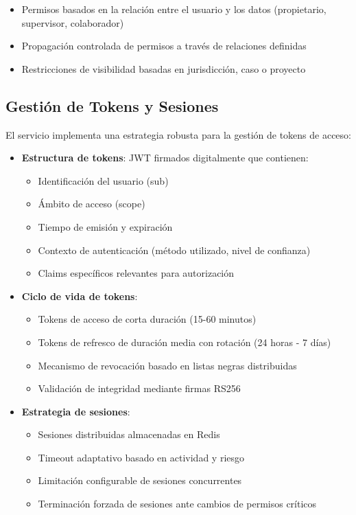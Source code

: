 \documentclass[12pt,a4paper]{article}
\begin{document}
\begin{itemize}
    \item Permisos basados en la relación entre el usuario y los datos (propietario, supervisor, colaborador)
    \item Propagación controlada de permisos a través de relaciones definidas
    \item Restricciones de visibilidad basadas en jurisdicción, caso o proyecto
\end{itemize}

\subsection{Gestión de Tokens y Sesiones}
\label{subsec:as-tokens}

El servicio implementa una estrategia robusta para la gestión de tokens de acceso:

\begin{itemize}
    \item \textbf{Estructura de tokens}: JWT firmados digitalmente que contienen:
    \begin{itemize}
        \item Identificación del usuario (sub)
        \item Ámbito de acceso (scope)
        \item Tiempo de emisión y expiración
        \item Contexto de autenticación (método utilizado, nivel de confianza)
        \item Claims específicos relevantes para autorización
    \end{itemize}
    
    \item \textbf{Ciclo de vida de tokens}:
    \begin{itemize}
        \item Tokens de acceso de corta duración (15-60 minutos)
        \item Tokens de refresco de duración media con rotación (24 horas - 7 días)
        \item Mecanismo de revocación basado en listas negras distribuidas
        \item Validación de integridad mediante firmas RS256
    \end{itemize}
    
    \item \textbf{Estrategia de sesiones}:
    \begin{itemize}
        \item Sesiones distribuidas almacenadas en Redis
        \item Timeout adaptativo basado en actividad y riesgo
        \item Limitación configurable de sesiones concurrentes
        \item Terminación forzada de sesiones ante cambios de permisos críticos
    \end{itemize}
\end{itemize}
\end{document}
